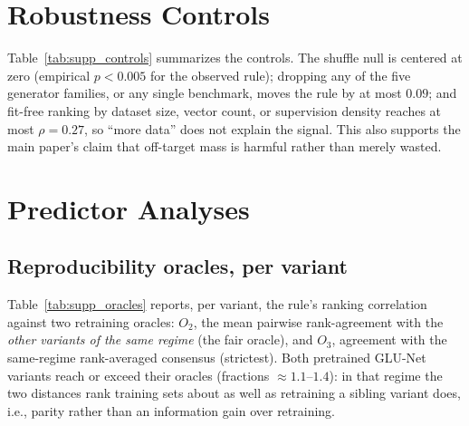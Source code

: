 \documentclass[runningheads]{llncs}
\begin{document}
\begin{table}[h]
\centering
\caption{The same analysis as main-paper Table~\ref{tab:law} (the coverage law), in appearance (DINO) space.
No direction carries usable signal (all $\rho \in [-0.35,-0.15]$) and the
aggregate flip is null ($+0.018$, $p{=}0.43$).}
\label{tab:supp_dino}
\scriptsize

\end{table}

\section{Robustness Controls}
\label{supp:robust}

Table~\ref{tab:supp_controls} summarizes the controls. The shuffle null is
centered at zero (empirical $p{<}0.005$ for the observed rule); dropping any
of the five generator families, or any single benchmark, moves the rule by at
most $0.09$; and fit-free ranking by dataset size, vector count, or
supervision density reaches at most $\rho{=}0.27$, so ``more data'' does not
explain the signal. This also supports the main paper's claim that off-target
mass is harmful rather than merely wasted.

\begin{table}[h]
\centering
\caption{Robustness controls for the fit-free rule.}
\label{tab:supp_controls}
\small

\end{table}

\section{Predictor Analyses}
\label{supp:predict}

\subsection{Reproducibility oracles, per variant}
Table~\ref{tab:supp_oracles} reports, per variant, the rule's ranking
correlation against two retraining oracles: $O_2$, the mean pairwise
rank-agreement with the \emph{other variants of the same regime} (the fair
oracle), and $O_3$, agreement with the same-regime rank-averaged consensus
(strictest). Both pretrained GLU-Net variants reach or exceed their oracles
(fractions ${\approx}1.1$--$1.4$): in that regime the two distances rank
training sets about as well as retraining a sibling variant does, i.e., parity
rather than an information gain over retraining.
\end{document}
